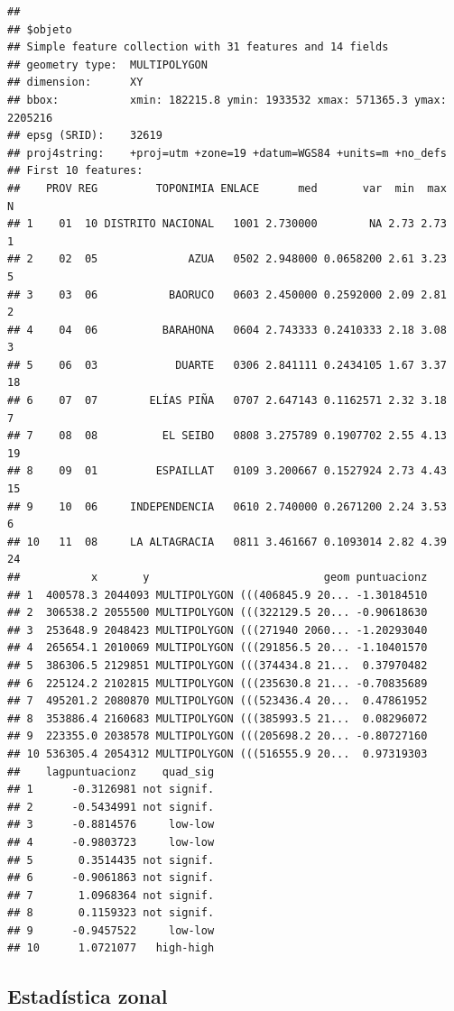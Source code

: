 \documentclass[11pt,]{article}
\begin{document}
\begin{verbatim}
## 
## $objeto
## Simple feature collection with 31 features and 14 fields
## geometry type:  MULTIPOLYGON
## dimension:      XY
## bbox:           xmin: 182215.8 ymin: 1933532 xmax: 571365.3 ymax: 2205216
## epsg (SRID):    32619
## proj4string:    +proj=utm +zone=19 +datum=WGS84 +units=m +no_defs
## First 10 features:
##    PROV REG         TOPONIMIA ENLACE      med       var  min  max  N
## 1    01  10 DISTRITO NACIONAL   1001 2.730000        NA 2.73 2.73  1
## 2    02  05              AZUA   0502 2.948000 0.0658200 2.61 3.23  5
## 3    03  06           BAORUCO   0603 2.450000 0.2592000 2.09 2.81  2
## 4    04  06          BARAHONA   0604 2.743333 0.2410333 2.18 3.08  3
## 5    06  03            DUARTE   0306 2.841111 0.2434105 1.67 3.37 18
## 6    07  07        ELÍAS PIÑA   0707 2.647143 0.1162571 2.32 3.18  7
## 7    08  08          EL SEIBO   0808 3.275789 0.1907702 2.55 4.13 19
## 8    09  01         ESPAILLAT   0109 3.200667 0.1527924 2.73 4.43 15
## 9    10  06     INDEPENDENCIA   0610 2.740000 0.2671200 2.24 3.53  6
## 10   11  08     LA ALTAGRACIA   0811 3.461667 0.1093014 2.82 4.39 24
##           x       y                           geom puntuacionz
## 1  400578.3 2044093 MULTIPOLYGON (((406845.9 20... -1.30184510
## 2  306538.2 2055500 MULTIPOLYGON (((322129.5 20... -0.90618630
## 3  253648.9 2048423 MULTIPOLYGON (((271940 2060... -1.20293040
## 4  265654.1 2010069 MULTIPOLYGON (((291856.5 20... -1.10401570
## 5  386306.5 2129851 MULTIPOLYGON (((374434.8 21...  0.37970482
## 6  225124.2 2102815 MULTIPOLYGON (((235630.8 21... -0.70835689
## 7  495201.2 2080870 MULTIPOLYGON (((523436.4 20...  0.47861952
## 8  353886.4 2160683 MULTIPOLYGON (((385993.5 21...  0.08296072
## 9  223355.0 2038578 MULTIPOLYGON (((205698.2 20... -0.80727160
## 10 536305.4 2054312 MULTIPOLYGON (((516555.9 20...  0.97319303
##    lagpuntuacionz    quad_sig
## 1      -0.3126981 not signif.
## 2      -0.5434991 not signif.
## 3      -0.8814576     low-low
## 4      -0.9803723     low-low
## 5       0.3514435 not signif.
## 6      -0.9061863 not signif.
## 7       1.0968364 not signif.
## 8       0.1159323 not signif.
## 9      -0.9457522     low-low
## 10      1.0721077   high-high
\end{verbatim}

\subsection{Estadística zonal}\label{estaduxedstica-zonal-1}
\end{document}
